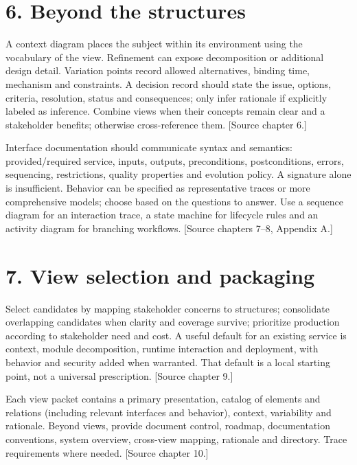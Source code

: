 \documentclass[11pt,letterpaper]{article}
\begin{document}
\section*{6. Beyond the structures}
A context diagram places the subject within its environment using the vocabulary of the view. Refinement can expose decomposition or additional design detail. Variation points record allowed alternatives, binding time, mechanism and constraints. A decision record should state the issue, options, criteria, resolution, status and consequences; only infer rationale if explicitly labeled as inference. Combine views when their concepts remain clear and a stakeholder benefits; otherwise cross-reference them. [Source chapter 6.]\par\smallskip
Interface documentation should communicate syntax and semantics: provided/required service, inputs, outputs, preconditions, postconditions, errors, sequencing, restrictions, quality properties and evolution policy. A signature alone is insufficient. Behavior can be specified as representative traces or more comprehensive models; choose based on the questions to answer. Use a sequence diagram for an interaction trace, a state machine for lifecycle rules and an activity diagram for branching workflows. [Source chapters 7--8, Appendix A.]\par\smallskip
\section*{7. View selection and packaging}
Select candidates by mapping stakeholder concerns to structures; consolidate overlapping candidates when clarity and coverage survive; prioritize production according to stakeholder need and cost. A useful default for an existing service is context, module decomposition, runtime interaction and deployment, with behavior and security added when warranted. That default is a local starting point, not a universal prescription. [Source chapter 9.]\par\smallskip
Each view packet contains a primary presentation, catalog of elements and relations (including relevant interfaces and behavior), context, variability and rationale. Beyond views, provide document control, roadmap, documentation conventions, system overview, cross-view mapping, rationale and directory. Trace requirements where needed. [Source chapter 10.]\par\smallskip
\end{document}
